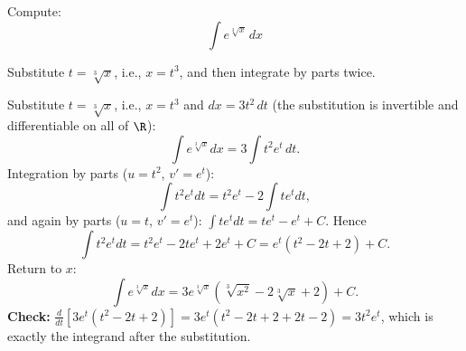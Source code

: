 
\begin{question}
Compute:
\[ \int e^{\sqrt[3]{x}}\,dx \]
\end{question}

\begin{hint}
Substitute $t=\sqrt[3]x$, i.e., $x=t^3$, and then integrate by parts twice.
\end{hint}

\begin{solution}
Substitute $t=\sqrt[3]x$, i.e., $x=t^3$ and $dx=3t^2\,dt$ (the substitution is invertible and differentiable on all of $\R$):
\[ \int e^{\sqrt[3]x}dx=3\int t^2e^t\,dt. \]
Integration by parts ($u=t^2$, $v'=e^t$):
\[ \int t^2e^tdt=t^2e^t-2\int te^tdt, \]
and again by parts ($u=t$, $v'=e^t$): $\int te^tdt=te^t-e^t+C$. Hence
\[ \int t^2e^tdt=t^2e^t-2te^t+2e^t+C=e^t(t^2-2t+2)+C. \]
Return to $x$:
\[ \boxed{\int e^{\sqrt[3]x}dx=3e^{\sqrt[3]x}\left(\sqrt[3]{x^2}-2\sqrt[3]x+2\right)+C.} \]
\textbf{Check:} $\frac{d}{dt}\left[3e^t(t^2-2t+2)\right]=3e^t(t^2-2t+2+2t-2)=3t^2e^t$, which is exactly the integrand after the substitution.
\end{solution}
